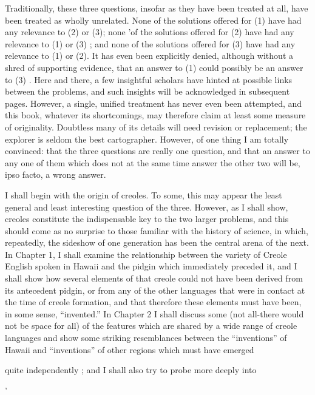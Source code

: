 Traditionally, these three questions, insofar as they have been treated at all, have been treated as wholly unrelated. None of the solutions offered for (1) have had any relevance to (2) or (3); none 'of the solu\-tions offered for (2) have had any relevance to (1) or (3) ; and none of the solutions offered for (3) have had any relevance to (1) or (2). It has even been explicitly denied, although without a shred of support\-ing evidence, that an answer to (1) could possibly be an answer to (3) \citep{Sankoff1979}. Here and there, a few insightful scholars have hinted at possible links between the problems, and such insights will be ac\-knowledged in subsequent pages. However, a single, unified treatment has never even been attempted, and this book, whatever its short\-comings, may therefore claim at least some measure of originality. Doubtless many of its details will need revision or replacement; the explorer is seldom the best cartographer. However, of one thing I am totally convinced: that the three questions are really one question, and that an answer to any one of them which does not at the same time answer the other two will be, ipso facto, a wrong answer.

I shall begin with the origin of creoles. To some, this may appear the least general and least interesting question of the three. However, as I shall show, creoles constitute the indispensable key to the two larger problems, and this should come as no surprise to those familiar with the history of science, in which, repeatedly, the sideshow of one generation has been the central arena of the next. In Chapter 1, I shall examine the relationship between the variety of Creole English spoken in Hawaii and the pidgin which immediately preceded it, and I shall show how several elements of that creole could not have been derived from its antecedent pidgin, or from any of the other languages that were in contact at the time of creole formation, and that therefore these elements must have been, in some sense, ``invented.'' In Chap\-ter 2 I shall discuss some (not all-there would not be space for all) of the features which are shared by a wide range of creole languages and show some striking resemblances between the ``inventions'' of Hawaii and ``inventions'' of other regions which must have emerged

quite independently ; and I shall also try to probe more deeply into

'

